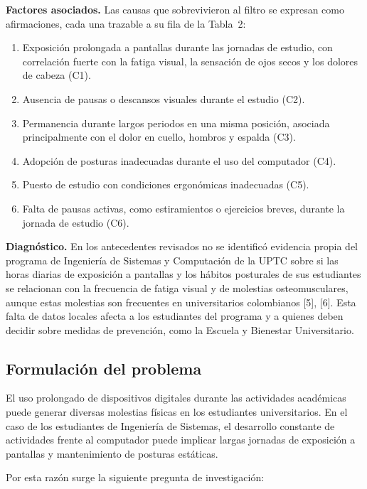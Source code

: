 \bigskip
\noindent\textbf{Factores asociados.} Las causas que sobrevivieron al filtro se expresan
como afirmaciones, cada una trazable a su fila de la Tabla~2:

\begin{enumerate}[leftmargin=1.8em,itemsep=0.2em]
  \item Exposición prolongada a pantallas durante las jornadas de estudio, con
  correlación fuerte con la fatiga visual, la sensación de ojos secos y los dolores de
  cabeza (C1).
  \item Ausencia de pausas o descansos visuales durante el estudio (C2).
  \item Permanencia durante largos periodos en una misma posición, asociada
  principalmente con el dolor en cuello, hombros y espalda (C3).
  \item Adopción de posturas inadecuadas durante el uso del computador (C4).
  \item Puesto de estudio con condiciones ergonómicas inadecuadas (C5).
  \item Falta de pausas activas, como estiramientos o ejercicios breves, durante la
  jornada de estudio (C6).
\end{enumerate}

\medskip
\noindent\textbf{Diagnóstico.} En los antecedentes revisados no se identificó evidencia
propia del programa de Ingeniería de Sistemas y Computación de la UPTC sobre si las
horas diarias de exposición a pantallas y los hábitos posturales de sus estudiantes se
relacionan con la frecuencia de fatiga visual y de molestias osteomusculares, aunque
estas molestias son frecuentes en universitarios colombianos [5], [6]. Esta falta de
datos locales afecta a los estudiantes del programa y a quienes deben decidir sobre
medidas de prevención, como la Escuela y Bienestar Universitario.

\subsection{Formulación del problema}

El uso prolongado de dispositivos digitales durante las actividades académicas puede generar
diversas molestias físicas en los estudiantes universitarios. En el caso de los estudiantes
de Ingeniería de Sistemas, el desarrollo constante de actividades frente al computador
puede implicar largas jornadas de exposición a pantallas y mantenimiento de posturas
estáticas.

Por esta razón surge la siguiente pregunta de investigación:

